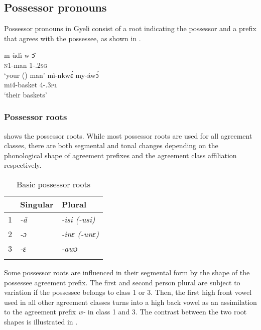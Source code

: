 \subsection{Possessor pronouns}
\label{sec:POSS}

\noindent Possessor pronouns in Gyeli consist of a root indicating the possessor and a prefix that agrees with the possessee, as shown in .

\ea \label{POSS}
  \ea  \label{POSS1}
  \gll     m-ùdì w-ɔ̂ \\
                \textsc{n}1-man 1-{\POSS}.2\textsc{sg} \\
    \trans `your ({\SG}) man'
\ex\label{POSS2}
 \gll     mì-nkwɛ́ my-áwɔ́ \\
                mi4-basket 4-{\POSS}.3\textsc{pl} \\
    \trans `their baskets'
\z
\z

\subsubsection*{Possessor roots}   shows the possessor roots. While most possessor roots are used for all agreement classes, there are both segmental and tonal changes depending on the phonological shape of agreement prefixes and the agreement class affiliation respectively.

\begin{table}
\begin{tabular}{lll}
 \lsptoprule
 & Singular & Plural \\
  \midrule
 1 & \itshape{-ã} & \itshape{-isi} (\itshape{-usi}) \\
 2 & \itshape{-ɔ} & \itshape{-inɛ} (\itshape{-unɛ}) \\
 3 & \itshape{-ɛ} & \itshape{-awɔ} \\
  \lspbottomrule
\end{tabular}
\caption{Basic possessor roots}
\label{Tab:SegPoss}
\end{table}

 \noindent  Some possessor roots are influenced in their segmental form by the shape of the possessee agreement prefix. The first and second person plural are subject to variation if the possessee belongs to class 1 or 3. Then, the first high front vowel used in all other agreement classes turns into a high back vowel as an assimilation to the agreement prefix {\itshape w-} in class 1 and 3. The contrast between the two root shapes is illustrated in .

